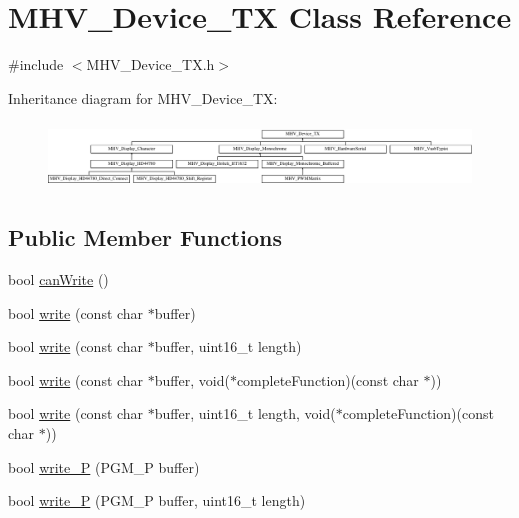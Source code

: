 \hypertarget{class_m_h_v___device___t_x}{
\section{\-M\-H\-V\-\_\-\-Device\-\_\-\-T\-X \-Class \-Reference}
\label{class_m_h_v___device___t_x}
}


{\ttfamily \#include $<$\-M\-H\-V\-\_\-\-Device\-\_\-\-T\-X.\-h$>$}

\-Inheritance diagram for \-M\-H\-V\-\_\-\-Device\-\_\-\-T\-X\-:\begin{figure}[H]
\begin{center}
\leavevmode
\includegraphics[height=1.770751cm]{class_m_h_v___device___t_x}
\end{center}
\end{figure}
\subsection*{\-Public \-Member \-Functions}
\begin{DoxyCompactItemize}
\item 
bool \hyperlink{class_m_h_v___device___t_x_a8fe33d10a27066c0f2e3f2339230692b}{can\-Write} ()
\item 
bool \hyperlink{class_m_h_v___device___t_x_ab24711b24c91592e0b86760820fd0d64}{write} (const char $\ast$buffer)
\item 
bool \hyperlink{class_m_h_v___device___t_x_a0f909191e9d73244be62d0b162f1567a}{write} (const char $\ast$buffer, uint16\-\_\-t length)
\item 
bool \hyperlink{class_m_h_v___device___t_x_a26a2e5e2c013300f9d870c8007980825}{write} (const char $\ast$buffer, void($\ast$complete\-Function)(const char $\ast$))
\item 
bool \hyperlink{class_m_h_v___device___t_x_ae723c03cb89924b25c150b9a48e444dc}{write} (const char $\ast$buffer, uint16\-\_\-t length, void($\ast$complete\-Function)(const char $\ast$))
\item 
bool \hyperlink{class_m_h_v___device___t_x_ae3385162a92a95687c2021fe222748f1}{write\-\_\-\-P} (\-P\-G\-M\-\_\-\-P buffer)
\item 
bool \hyperlink{class_m_h_v___device___t_x_a24a8e3b10463bc08579f8707abb25fbe}{write\-\_\-\-P} (\-P\-G\-M\-\_\-\-P buffer, uint16\-\_\-t length)
\end{DoxyCompactItemize}
